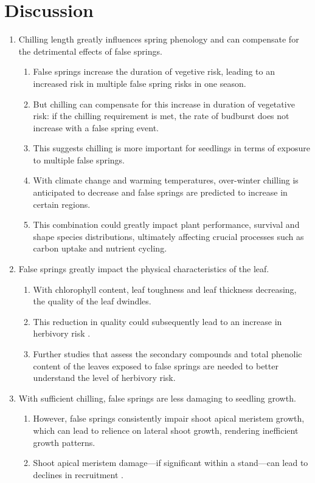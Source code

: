 \documentclass{article}\usepackage[]{graphicx}\usepackage[]{color}
\begin{document}
\section*{Discussion}
\begin{enumerate}
\item Chilling length greatly influences spring phenology and can compensate for the detrimental effects of false springs.
  \begin{enumerate}
  \item False springs increase the duration of vegetive risk, leading to an increased risk in multiple false spring risks in one season.
  \item But chilling can compensate for this increase in duration of vegetative risk: if the chilling requirement is met, the rate of budburst does not increase with a false spring event.
  \item This suggests chilling is more important for seedlings in terms of exposure to multiple false springs.
  \item With climate change and warming temperatures, over-winter chilling is anticipated to decrease and false springs are predicted to increase in certain regions.
  \item This combination could greatly impact plant performance, survival and shape species distributions, ultimately affecting crucial processes such as carbon uptake and nutrient cycling.
  \end{enumerate}
  
\item False springs greatly impact the physical characteristics of the leaf.
  \begin{enumerate}
  \item With chlorophyll content, leaf toughness and leaf thickness decreasing, the quality of the leaf dwindles.
  \item This reduction in quality could subsequently lead to an increase in herbivory risk \citep{Onda2011}.
  \item Further studies that assess the secondary compounds and total phenolic content \citep{Ayres1993, Webber2016} of the leaves exposed to false springs are needed to better understand the level of herbivory risk. 
  \end{enumerate}
  
\item With sufficient chilling, false springs are less damaging to seedling growth.
  \begin{enumerate}
  \item However, false springs consistently impair shoot apical meristem growth, which can lead to relience on lateral shoot growth, rendering inefficient growth patterns.
  \item Shoot apical meristem damage---if significant within a stand---can lead to declines in recruitment \citep{Rhodes2018}. 
  \end{enumerate}
  

\end{enumerate}
\end{document}
